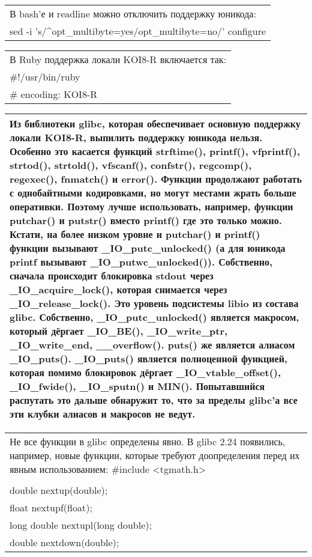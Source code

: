 \documentclass[14pt,openany]{book}
\begin{document}
\begin{center}
\begin{tabular}{|p{\textwidth}|}
\hline
В bash'е и readline можно отключить поддержку юникода: \\
sed -i 's/\^{}opt\_multibyte=yes/opt\_multibyte=no/' configure \\
\hline
\end{tabular}
\begin{tabular}{|p{\textwidth}|}
\hline
В Ruby поддержка локали KOI8-R включается так: \\
\#!/usr/bin/ruby \\
\# encoding: KOI8-R \\
\hline
\end{tabular}
\begin{tabular}{|p{\textwidth}|}
\hline
Из библиотеки glibc, которая обеспечивает основную поддержку локали KOI8-R, выпилить поддержку юникода нельзя. Особенно это касается функций strftime(), printf(), vfprintf(), strtod(), strtold(), vfscanf(), confstr(), regcomp(), regexec(), fnmatch() и error(). Функции продолжают работать с однобайтными кодировками, но могут местами жрать больше оперативки. Поэтому лучше использовать, например, функции putchar() и putstr() вместо printf() где это только можно. Кстати, на более низком уровне и putchar() и printf() функции вызывают \_IO\_putc\_unlocked() (а для юникода printf вызывают \_IO\_putwc\_unlocked()). Собственно, сначала происходит блокировка stdout через \_IO\_acquire\_lock(), которая снимается через \_IO\_release\_lock(). Это уровень подсистемы libio из состава glibc. Собственно, \_IO\_putc\_unlocked() является макросом, который дёргает \_IO\_BE(), \_IO\_write\_ptr, \_IO\_write\_end, \_\_overflow(). puts() же является алиасом \_IO\_puts(). \_IO\_puts() является полноценной функцией, которая помимо блокировок дёргает \_IO\_vtable\_offset(), \_IO\_fwide(), \_IO\_sputn() и MIN(). Попытавшийся распутать это дальше обнаружит то, что за пределы glibc'а все эти клубки алиасов и макросов не ведут. \\
\hline
\end{tabular}
\begin{tabular}{|p{\textwidth}|}
\hline
Не все функции в glibc определены явно. В glibc 2.24 появились, например, новые функции, которые требуют доопределения перед их явным использованием:
\#include <tgmath.h> \\
 \\
double nextup(double); \\
float nextupf(float); \\
long double nextupl(long double); \\
double nextdown(double); \\

\end{tabular}
\end{center}
\end{document}
